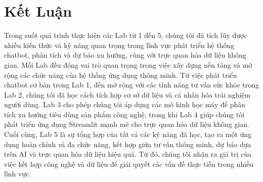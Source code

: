 \documentclass[a4paper,12pt]{report}
\begin{document}
\chapter{Kết Luận}
Trong suốt quá trình thực hiện các Lab từ 1 đến 5, chúng tôi đã tích lũy được nhiều kiến thức và kỹ năng quan trọng trong lĩnh vực phát triển hệ thống chatbot, phân tích và dự báo xu hướng, cùng với trực quan hóa dữ liệu không gian. Mỗi Lab đều đóng vai trò quan trọng trong việc xây dựng nền tảng và mở rộng các chức năng của hệ thống ứng dụng thông minh. Từ việc phát triển chatbot cơ bản trong Lab 1, đến mở rộng với các tính năng tư vấn sức khỏe trong Lab 2, chúng tôi đã học cách tích hợp cơ sở dữ liệu và cá nhân hóa trải nghiệm người dùng. Lab 3 cho phép chúng tôi áp dụng các mô hình học máy để phân tích xu hướng tiêu dùng sản phẩm công nghệ, trong khi Lab 4 giúp chúng tôi phát triển ứng dụng Streamlit mạnh mẽ cho trực quan hóa dữ liệu không gian. Cuối cùng, Lab 5 là sự tổng hợp của tất cả các kỹ năng đã học, tạo ra một ứng dụng hoàn chỉnh và đa chức năng, kết hợp giữa tư vấn thông minh, dự báo dựa trên AI và trực quan hóa dữ liệu hiệu quả. Từ đó, chúng tôi nhận ra giá trị của việc kết hợp công nghệ và dữ liệu để giải quyết các vấn đề thực tiễn trong nhiều lĩnh vực.
\end{document}
